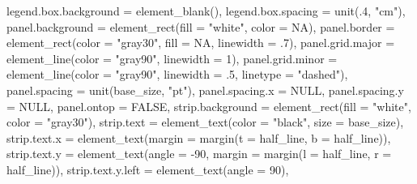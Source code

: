 \documentclass[
  letterpaper,
  DIV=11,
  numbers=noendperiod]{scrreprt}
\newenvironment{Shaded}{\begin{snugshade}}{\end{snugshade}}
\newcommand{\AttributeTok}[1]{\textcolor[rgb]{0.40,0.45,0.13}{#1}}
\newcommand{\ConstantTok}[1]{\textcolor[rgb]{0.56,0.35,0.01}{#1}}
\newcommand{\DecValTok}[1]{\textcolor[rgb]{0.68,0.00,0.00}{#1}}
\newcommand{\FunctionTok}[1]{\textcolor[rgb]{0.28,0.35,0.67}{#1}}
\newcommand{\NormalTok}[1]{\textcolor[rgb]{0.00,0.23,0.31}{#1}}
\newcommand{\SpecialCharTok}[1]{\textcolor[rgb]{0.37,0.37,0.37}{#1}}
\newcommand{\StringTok}[1]{\textcolor[rgb]{0.13,0.47,0.30}{#1}}
\begin{document}
\begin{Shaded}
\begin{Highlighting}[]
    \AttributeTok{legend.box.background =} \FunctionTok{element\_blank}\NormalTok{(),}
    \AttributeTok{legend.box.spacing =} \FunctionTok{unit}\NormalTok{(.}\DecValTok{4}\NormalTok{, }\StringTok{"cm"}\NormalTok{),}
    \AttributeTok{panel.background =} \FunctionTok{element\_rect}\NormalTok{(}\AttributeTok{fill =} \StringTok{"white"}\NormalTok{, }\AttributeTok{color =} \ConstantTok{NA}\NormalTok{),}
    \AttributeTok{panel.border =} \FunctionTok{element\_rect}\NormalTok{(}\AttributeTok{color =} \StringTok{"gray30"}\NormalTok{,}
                                \AttributeTok{fill =} \ConstantTok{NA}\NormalTok{, }\AttributeTok{linewidth =}\NormalTok{ .}\DecValTok{7}\NormalTok{),}
    \AttributeTok{panel.grid.major =} \FunctionTok{element\_line}\NormalTok{(}\AttributeTok{color =} \StringTok{"gray90"}\NormalTok{, }\AttributeTok{linewidth =} \DecValTok{1}\NormalTok{),}
    \AttributeTok{panel.grid.minor =} \FunctionTok{element\_line}\NormalTok{(}\AttributeTok{color =} \StringTok{"gray90"}\NormalTok{, }\AttributeTok{linewidth =}\NormalTok{ .}\DecValTok{5}\NormalTok{,}
                                    \AttributeTok{linetype =} \StringTok{"dashed"}\NormalTok{),}
    \AttributeTok{panel.spacing =} \FunctionTok{unit}\NormalTok{(base\_size, }\StringTok{"pt"}\NormalTok{),}
    \AttributeTok{panel.spacing.x =} \ConstantTok{NULL}\NormalTok{,}
    \AttributeTok{panel.spacing.y =} \ConstantTok{NULL}\NormalTok{,}
    \AttributeTok{panel.ontop =} \ConstantTok{FALSE}\NormalTok{,}
    \AttributeTok{strip.background =} \FunctionTok{element\_rect}\NormalTok{(}\AttributeTok{fill =} \StringTok{"white"}\NormalTok{, }\AttributeTok{color =} \StringTok{"gray30"}\NormalTok{),}
    \AttributeTok{strip.text =} \FunctionTok{element\_text}\NormalTok{(}\AttributeTok{color =} \StringTok{"black"}\NormalTok{, }\AttributeTok{size =}\NormalTok{ base\_size),}
    \AttributeTok{strip.text.x =} \FunctionTok{element\_text}\NormalTok{(}\AttributeTok{margin =} \FunctionTok{margin}\NormalTok{(}\AttributeTok{t =}\NormalTok{ half\_line,}
                                                \AttributeTok{b =}\NormalTok{ half\_line)),}
    \AttributeTok{strip.text.y =} \FunctionTok{element\_text}\NormalTok{(}\AttributeTok{angle =} \SpecialCharTok{{-}}\DecValTok{90}\NormalTok{,}
                                \AttributeTok{margin =} \FunctionTok{margin}\NormalTok{(}\AttributeTok{l =}\NormalTok{ half\_line,}
                                                \AttributeTok{r =}\NormalTok{ half\_line)),}
    \AttributeTok{strip.text.y.left =} \FunctionTok{element\_text}\NormalTok{(}\AttributeTok{angle =} \DecValTok{90}\NormalTok{),}

\end{Highlighting}
\end{Shaded}
\end{document}
